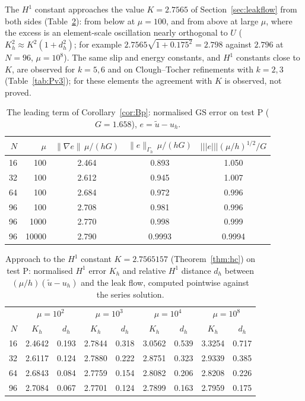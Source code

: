\documentclass[pdflatex,sn-mathphys-num]{sn-jnl}
\theoremstyle{thmstyleone}
\theoremstyle{thmstylethree}
\newcommand{\Gh}{\Gamma_h}
\newcommand{\ut}{\tilde u}
\newcommand{\tnorm}[1]{|\!|\!|#1|\!|\!|}
\newcommand{\norm}[1]{\lVert #1\rVert}
\newcommand{\GS}{\mathrm{GS}}
\begin{document}
The $H^1$ constant approaches the value $K=2.7565$ of Section~\ref{sec:leakflow} from both sides (Table~\ref{tab:hc}): from below at $\mu=100$, and from above at large $\mu$, where the excess is an element-scale oscillation nearly orthogonal to $U$ ($K_h^2\approx K^2(1+d_h^2)$; for example $2.7565\sqrt{1+0.175^2}=2.798$ against $2.796$ at $N=96$, $\mu=10^8$). The same slip and energy constants, and $H^1$ constants close to $K$, are observed for $k=5,6$ and on Clough--Tocher refinements with $k=2,3$ (Table~\ref{tab:Pv3}); for these elements the agreement with $K$ is observed, not proved.

\begin{table}[t]
\centering\small
\caption{The leading term of Corollary~\ref{cor:Bp}: normalised $\GS$ error on test P ($G=1.658$), $e=\ut-u_h$.}\label{tab:P}
\begin{tabular}{rrccc}
\toprule
$N$ & $\mu$ & $\norm{\nabla e}\,\mu/(hG)$ & $\norm{e}_{\Gh}\,\mu/(hG)$ & $\tnorm{e}(\mu/h)^{1/2}/G$\\
\midrule
16 & 100 & 2.464 & 0.893 & 1.050\\
32 & 100 & 2.612 & 0.945 & 1.007\\
64 & 100 & 2.684 & 0.972 & 0.996\\
96 & 100 & 2.708 & 0.981 & 0.996\\
96 & 1000 & 2.770 & 0.998 & 0.999\\
96 & 10000 & 2.790 & 0.9993 & 0.9994\\
\bottomrule
\end{tabular}
\end{table}

\begin{table}[t]
\centering\small
\caption{Approach to the $H^1$ constant $K=2.7565157$ (Theorem~\ref{thm:hc}) on test P: normalised $H^1$ error $K_h$ and relative $H^1$ distance $d_h$ between $(\mu/h)(\ut-u_h)$ and the leak flow, computed pointwise against the series solution.}\label{tab:hc}
\begin{tabular}{r|cc|cc|cc|cc}
\toprule
 & \multicolumn{2}{c|}{$\mu=10^2$} & \multicolumn{2}{c|}{$\mu=10^3$} & \multicolumn{2}{c|}{$\mu=10^4$} & \multicolumn{2}{c}{$\mu=10^8$}\\
$N$ & $K_h$ & $d_h$ & $K_h$ & $d_h$ & $K_h$ & $d_h$ & $K_h$ & $d_h$\\
\midrule
16 & 2.4642 & 0.193 & 2.7844 & 0.318 & 3.0562 & 0.539 & 3.3254 & 0.717\\
32 & 2.6117 & 0.124 & 2.7880 & 0.222 & 2.8751 & 0.323 & 2.9339 & 0.385\\
64 & 2.6843 & 0.084 & 2.7759 & 0.154 & 2.8082 & 0.206 & 2.8208 & 0.226\\
96 & 2.7084 & 0.067 & 2.7701 & 0.124 & 2.7899 & 0.163 & 2.7959 & 0.175\\
\bottomrule
\end{tabular}
\end{table}
\end{document}
